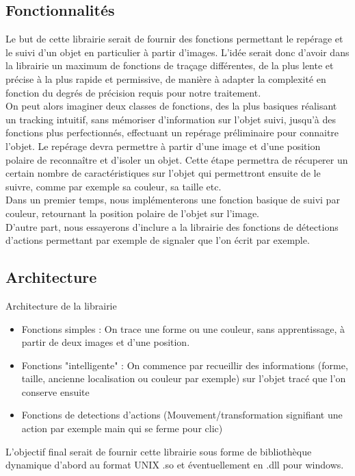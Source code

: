 \documentclass{article}
\begin{document}
		\subsection{Fonctionnalités}
			Le but de cette librairie serait de fournir des fonctions permettant le repérage et le suivi d'un objet en particulier à partir d'images. 
			L'idée serait donc d'avoir dans la librairie un maximum de fonctions de traçage différentes, de la plus lente et précise à la plus rapide et permissive, de manière à adapter la complexité en fonction du degrés de précision requis pour notre traitement. \\
			On peut alors imaginer deux classes de fonctions, des la plus basiques réalisant un tracking intuitif, sans mémoriser d'information sur l'objet suivi, jusqu'à des fonctions plus perfectionnés, effectuant un repérage préliminaire pour connaitre l'objet.
			Le repérage devra permettre à partir d'une image et d'une position polaire de reconnaître et d'isoler un objet. Cette étape permettra de récuperer un certain nombre de caractéristiques sur l'objet qui permettront ensuite de le suivre, comme par exemple sa couleur, sa taille etc. \\
Dans un premier temps, nous implémenterons une fonction basique de suivi par couleur, retournant la position polaire de l'objet sur l'image. \\
D'autre part, nous essayerons d'inclure a la librairie des fonctions de détections d'actions permettant par exemple de signaler que l'on écrit par exemple. 
		\subsection{Architecture}
			Architecture de la librairie 
			\begin{itemize}
			\item Fonctions simples : On trace une forme ou une couleur, sans apprentissage, à partir de deux images et d'une position.
			\item Fonctions "intelligente" : On commence par recueillir des informations (forme, taille, ancienne localisation ou couleur par exemple) sur l'objet tracé que l'on conserve ensuite    
			\item Fonctions de detections d'actions (Mouvement/transformation signifiant une action par exemple main qui se ferme pour clic)
			\end{itemize}
			L'objectif final serait de fournir cette librairie sous forme de bibliothèque dynamique d'abord au format UNIX .so et éventuellement en .dll pour windows. 
\end{document}
